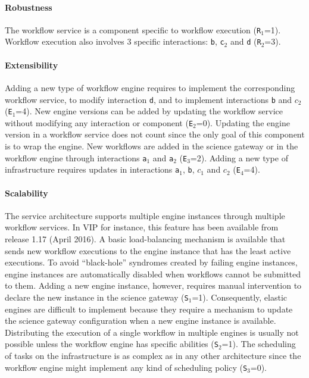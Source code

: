 \documentclass[preprint,3p,twocolumn]{elsarticle}
\begin{document}
\paragraph{Robustness} The workflow service is a component specific to
workflow execution (\texttt{R$_1$}=1). Workflow execution also
involves 3 specific interactions: \texttt{b},
\texttt{c$_2$} and \texttt{d} (\texttt{R$_2$}=3).

\paragraph{Extensibility} Adding a new type of workflow engine
requires to implement the corresponding workflow service, to modify
interaction \texttt{d}, and to implement interactions \texttt{b} and
\texttt{$c_2$} (\texttt{E$_1$}=4). New engine versions can be added by
updating the workflow service without modifying any interaction or
component (\texttt{E$_2$}=0). Updating the engine version in a
workflow service does not count since the only goal of this component
is to wrap the engine.  New workflows are added in the science gateway
or in the workflow engine through interactions \texttt{a$_1$} and
\texttt{a$_2$} (\texttt{E$_3$}=2). Adding a new type of infrastructure
requires updates in interactions \texttt{a$_1$}, \texttt{b},
\texttt{$c_1$} and \texttt{$c_2$} (\texttt{E$_4$}=4).

\paragraph{Scalability} The service architecture supports multiple
engine instances through multiple workflow services. In VIP for
instance, this feature has been available from release 1.17 (April
2016). A basic load-balancing mechanism is available that sends new
workflow executions to the engine instance that has the least active
executions. To avoid ``black-hole'' syndromes created by failing
engine instances, engine instances are automatically disabled when
workflows cannot be submitted to them. Adding a new engine instance,
however, requires manual intervention to declare the new instance in
the science gateway (\texttt{S$_1$}=1). Consequently, elastic engines
are difficult to implement because they require a mechanism to update
the science gateway configuration when a new engine instance is
available. Distributing the execution of a single
workflow in multiple engines is usually not possible unless the
workflow engine has specific abilities (\texttt{S$_2$}=1). The
scheduling of tasks on the infrastructure is as complex as in any
other architecture since the workflow engine might implement any kind
of scheduling policy (\texttt{S$_3$}=0).
\end{document}
